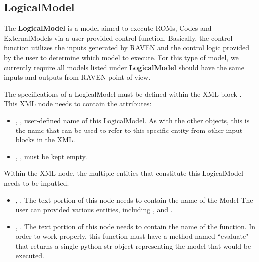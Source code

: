 %
%

\subsection{LogicalModel}
\label{subsec:models_LogicalModel}
The \textbf{LogicalModel} is a model aimed to execute ROMs,
Codes and ExternalModels via a user provided control function. Basically, the control function
utilizes the inputs generated by RAVEN and the control logic provided by the user to determine which
model to execute.
\nb For this type of model, we currently require all models listed under \textbf{LogicalModel} should
have the same inputs and outputs from RAVEN point of view.

The specifications of a LogicalModel must be defined within the XML block
.
%
This XML node needs to contain the attributes:

\vspace{-5mm}
\begin{itemize}
  \itemsep0em
  \item {}, , user-defined name
  of this LogicalModel.
  \nb As with the other objects, this is the name that can be used to refer to
  this specific entity from other input blocks in the XML.
  \item {}, , must be kept
  empty.
\end{itemize}
\vspace{-5mm}

Within the  XML node, the multiple entities that constitute
this LogicalModel needs to be inputted.

\begin{itemize}
  \item {}, .
  The text portion of this node needs to contain the name of the Model
  \nb The user can provided various  entities, including ,
   and .

  \item {}, .
  The text portion of this node needs to contain the name of the function.
  \nb In order to work properly, this function must have a method named ``evaluate"
  that returns a single python str object representing the model that would be
  executed.
\end{itemize}


